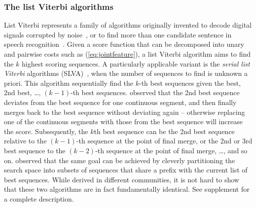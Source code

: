 

\subsubsection{The list Viterbi algorithms}
List Viterbi represents a family of algorithms originally invented to decode digital signals corrupted by noise~\cite{seshadri1994list}, or to find more than one candidate sentence in speech recognition~\cite{soong1991tree}. Given a score function that can be decomposed into unary and pairwise costs such as (\ref{eq:jointfeature}), a list Viterbi algorithm aims to find the $k$ highest scoring sequences. %
A particularly applicable variant is the \emph{serial list Viterbi} algorithms (SLVA)~\cite{seshadri1994list,nilsson2001sequentially}, when the number of sequences to find is unknown a priori. 
This algorithm sequentially find the $k$-th best sequences given the best, 2nd best, \dots, $(k \!-\! 1)$-th best sequences.
\citet{seshadri1994list} observed 
that the 2nd best sequence deviates from the best sequence
for one continuous segment, and then finally merges back to the best sequence without deviating again
-- otherwise replacing one of the continuous segments with those from the best sequence will increase the score.
Subsequently, the $k$th best sequence can be the 2nd best sequence relative to the $(k \!-\! 1)$-th sequence
at the point of final merge, or the 2nd or 3rd best sequence to the $(k \!-\! 2)$-th sequence at the point of final merge, \ldots, and so on. 
\citet{nilsson2001sequentially} observed that the same goal can be achieved by cleverly partitioning the search space into subsets of sequences that share a prefix with the current list of best sequences. While derived in different communities, it is not hard to show that these two algorithms are in fact fundamentally identical.
See supplement for a complete description.

